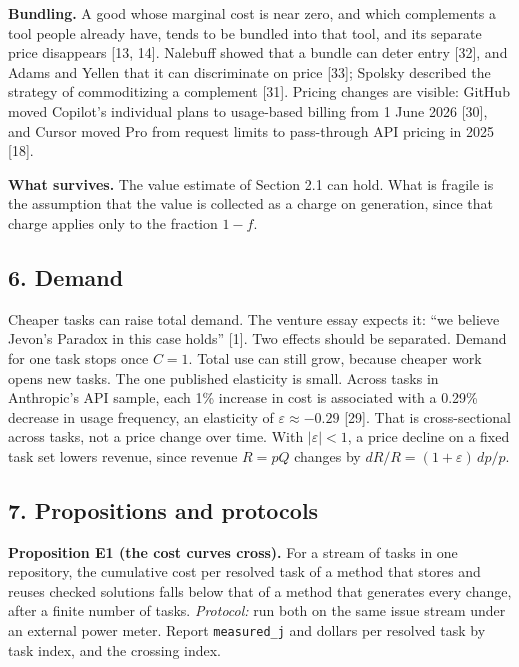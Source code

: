 \documentclass[
  10pt,
]{article}
\begin{document}
\textbf{Bundling.} A good whose marginal cost is near zero, and which
complements a tool people already have, tends to be bundled into that
tool, and its separate price disappears {[}13, 14{]}. Nalebuff showed
that a bundle can deter entry {[}32{]}, and Adams and Yellen that it can
discriminate on price {[}33{]}; Spolsky described the strategy of
commoditizing a complement {[}31{]}. Pricing changes are visible: GitHub
moved Copilot's individual plans to usage-based billing from 1 June 2026
{[}30{]}, and Cursor moved Pro from request limits to pass-through API
pricing in 2025 {[}18{]}.

\textbf{What survives.} The value estimate of Section 2.1 can hold. What
is fragile is the assumption that the value is collected as a charge on
generation, since that charge applies only to the fraction \(1 - f\).

\subsection{6. Demand}\label{demand}

Cheaper tasks can raise total demand. The venture essay expects it: ``we
believe Jevon's Paradox in this case holds'' {[}1{]}. Two effects should
be separated. Demand for one task stops once \(C = 1\). Total use can
still grow, because cheaper work opens new tasks. The one published
elasticity is small. Across tasks in Anthropic's API sample, each 1\%
increase in cost is associated with a 0.29\% decrease in usage
frequency, an elasticity of \(\varepsilon \approx -0.29\) {[}29{]}. That
is cross-sectional across tasks, not a price change over time. With
\(|\varepsilon| < 1\), a price decline on a fixed task set lowers
revenue, since revenue \(R = pQ\) changes by
\(dR/R = (1 + \varepsilon)\, dp/p\).

\subsection{7. Propositions and
protocols}\label{propositions-and-protocols}

\textbf{Proposition E1 (the cost curves cross).} For a stream of tasks
in one repository, the cumulative cost per resolved task of a method
that stores and reuses checked solutions falls below that of a method
that generates every change, after a finite number of tasks.
\emph{Protocol:} run both on the same issue stream under an external
power meter. Report \texttt{measured\_j} and dollars per resolved task
by task index, and the crossing index.
\end{document}
